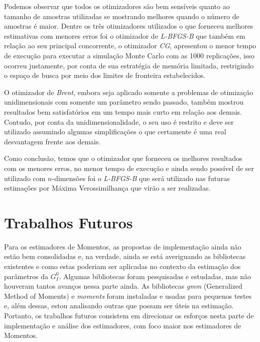 \documentclass[12pt]{article}
\begin{document}
Podemos observar que todos os otimizadores são bem sensíveis quanto ao tamanho de amostras utilizadas se mostrando melhores quando o número de amostras é maior. Dentre os três otimizadores utilizados o que forneceu melhores estimativas com menores erros foi o otimizador de \emph{L-BFGS-B} que também em relação ao seu principal concorrente, o otimizador \emph{CG}, apresentou o menor tempo de execução para executar a simulação Monte Carlo com as 1000 replicações, isso ocorreu justamente, por conta de sua estratégia de memória limitada, restrigindo o espaço de busca por meio dos limites de fronteira estabelecidos. 

O otimizador de \emph{Brent}, embora seja aplicado somente a problemas de otimização unidimensionais com somente um parâmetro sendo passado, também mostrou resultados bem satisfatórios em um tempo mais curto em relação aos demais. Contudo, por conta da unidimensionalidade, o seu uso é restrito e deve ser utilizado assumindo algumas simplificações o que certamente é uma real desvantagem frente aos demais.

Como conclusão, temos que o otimizador que forneceu os melhores resultados com os menores erros, no menor tempo de execução e ainda sendo possível de ser utilizado com $n$-dimensões foi o \emph{L-BFGS-B} que será utilizado nas futuras estimações por Máxima Verossimilhança que virão a ser realizadas.


\section{Trabalhos Futuros}

Para os estimadores de Momentos, as propostas de implementação ainda não estão bem consolidadas e, na verdade, ainda se está averiguando as bibliotecas existentes e como estas poderiam ser aplicadas no contexto da estimação dos parâmetros da $G_I^0$. Algumas bibliotecas foram pesquisadas e estudadas, mas não houveram tantos avanços nessa parte ainda. As bibliotecas \textit{gmm} (Generalized Method of Moments) e \textit{moments} foram instaladas e usadas para pequenos testes e, além dessas, estou analisando outras que possam ser úteis na estimação. Portanto, os trabalhos futuros consistem em direcionar os esforços nesta parte de implementação e análise dos estimadores, com foco maior nos estimadores de Momentos. 


\newpage

%

%
\end{document}
